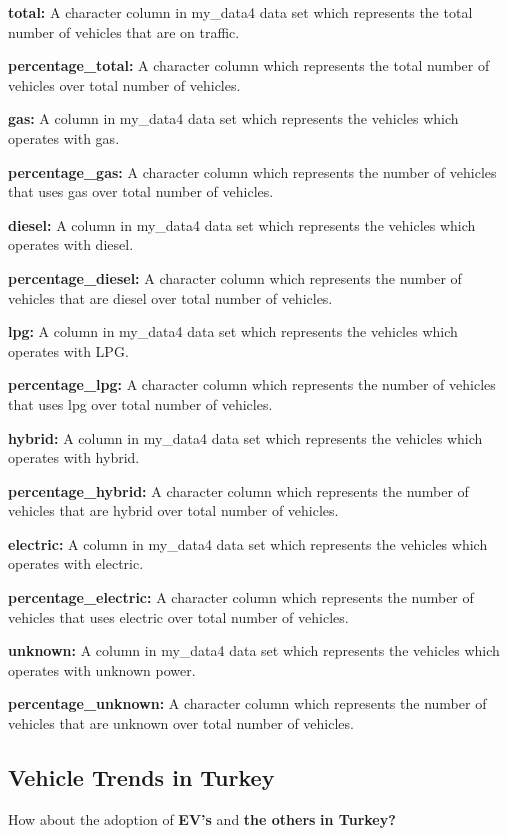 \documentclass[
  11pt,
  a4paper,
  DIV=11,
  numbers=noendperiod]{scrartcl}
\begin{document}
\textbf{total:} A character column in my\_data4 data set which
represents the total number of vehicles that are on traffic.

\textbf{percentage\_total:} A character column which represents the
total number of vehicles over total number of vehicles.

\textbf{gas:} A column in my\_data4 data set which represents the
vehicles which operates with gas.

\textbf{percentage\_gas:} A character column which represents the number
of vehicles that uses gas over total number of vehicles.

\textbf{diesel:} A column in my\_data4 data set which represents the
vehicles which operates with diesel.

\textbf{percentage\_diesel:} A character column which represents the
number of vehicles that are diesel over total number of vehicles.

\textbf{lpg:} A column in my\_data4 data set which represents the
vehicles which operates with LPG.

\textbf{percentage\_lpg:} A character column which represents the number
of vehicles that uses lpg over total number of vehicles.

\textbf{hybrid:} A column in my\_data4 data set which represents the
vehicles which operates with hybrid.

\textbf{percentage\_hybrid:} A character column which represents the
number of vehicles that are hybrid over total number of vehicles.

\textbf{electric:} A column in my\_data4 data set which represents the
vehicles which operates with electric.

\textbf{percentage\_electric:} A character column which represents the
number of vehicles that uses electric over total number of vehicles.

\textbf{unknown:} A column in my\_data4 data set which represents the
vehicles which operates with unknown power.

\textbf{percentage\_unknown:} A character column which represents the
number of vehicles that are unknown over total number of vehicles.

\subsection{Vehicle Trends in Turkey}\label{vehicle-trends-in-turkey}

How about the adoption of \textbf{EV's} and \textbf{the others}
\textbf{in Turkey?}
\end{document}
